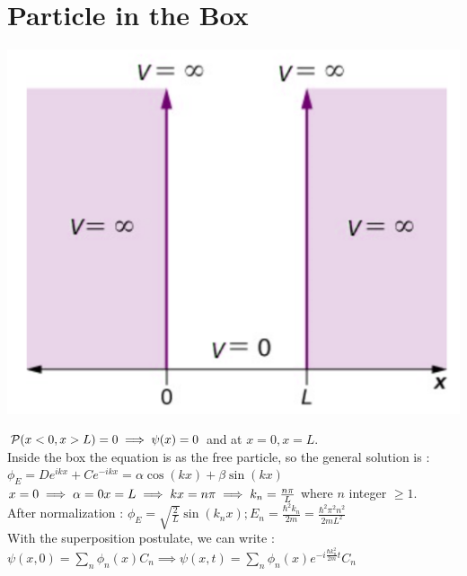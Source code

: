 \documentclass[12pt,oneside]{book}
\begin{document}
\section{Particle in the Box}
\begin{center}
	\includegraphics[width=0.5\linewidth]{../pic/3302/15.png}
\end{center}
$\mathcal{P}(x<0 , x> L) = 0 \implies \psi(x)= 0 $ and at $x=0,x=L$.\\
Inside the box the equation is as the free particle, so the general solution is :\\
$\phi_E = De^{ikx} + Ce^{-ikx} =\alpha\cos(kx) + \beta\sin(kx)$ \\
$x =0 \implies \alpha = 0\\
	x = L \implies kx = n\pi  \implies k_n = \frac{n\pi}{L}$  where $n $ integer $\geq 1$.\\
After normalization : $\phi_E = \sqrt{\frac{2}{L}}\sin(k_nx);E_n = \frac{\hbar^2k_n}{2m} = \frac{\hbar^2\pi^2n^2}{2mL^2}$ \\
With the superposition postulate, we can write :\\
$\psi(x,0) = \sum_n \phi_n(x)C_n \implies \boxed{\psi(x,t) = \sum_n\phi_n(x)e^{-i\frac{\hbar k_n^2}{2m}t}C_n}$
\end{document}
